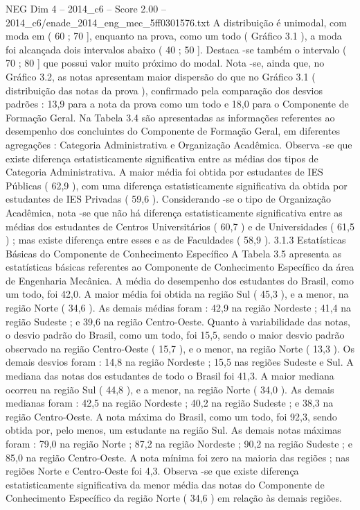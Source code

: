 \begin{textsample}{NEG Dim 4 – 2014\_c6 – Score 2.00 – 2014\_c6/enade\_2014\_eng\_mec\_5ff0301576.txt}
A distribuição é unimodal, com moda em ( 60 ; 70 ], enquanto na prova, como um todo ( Gráfico 3.1 ), a moda foi alcançada dois intervalos abaixo ( 40 ; 50 ].
Destaca -se também o intervalo ( 70 ; 80 ] que possui valor muito próximo do modal.
Nota -se, ainda que, no Gráfico 3.2, as notas apresentam maior dispersão do que no Gráfico 3.1 ( distribuição das notas da prova ), confirmado pela comparação dos desvios padrões : 13,9 para a nota da prova como um todo e 18,0 para o Componente de Formação Geral.
Na Tabela 3.4 são apresentadas as informações referentes ao desempenho dos concluintes do Componente de Formação Geral, em diferentes agregações : Categoria Administrativa e Organização Acadêmica.
Observa -se que existe diferença estatisticamente significativa entre as médias dos tipos de Categoria Administrativa.
A maior média foi obtida por estudantes de IES Públicas ( 62,9 ), com uma diferença estatisticamente significativa da obtida por estudantes de IES Privadas ( 59,6 ).
Considerando -se o tipo de Organização Acadêmica, nota -se que não há diferença estatisticamente significativa entre as médias dos estudantes de Centros Universitários ( 60,7 ) e de Universidades ( 61,5 ) ; mas existe diferença entre esses e as de Faculdades ( 58,9 ). 3.1.3 Estatísticas Básicas do Componente de Conhecimento Específico A Tabela 3.5 apresenta as estatísticas básicas referentes ao Componente de Conhecimento Específico da área de Engenharia Mecânica.
A média do desempenho dos estudantes do Brasil, como um todo, foi 42,0.
A maior média foi obtida na região Sul ( 45,3 ), e a menor, na região Norte ( 34,6 ).
As demais médias foram : 42,9 na região Nordeste ; 41,4 na região Sudeste ; e 39,6 na região Centro-Oeste.
Quanto à variabilidade das notas, o desvio padrão do Brasil, como um todo, foi 15,5, sendo o maior desvio padrão observado na região Centro-Oeste ( 15,7 ), e o menor, na região Norte ( 13,3 ).
Os demais desvios foram : 14,8 na região Nordeste ; 15,5 nas regiões Sudeste e Sul.
A mediana das notas dos estudantes de todo o Brasil foi 41,3.
A maior mediana ocorreu na região Sul ( 44,8 ), e a menor, na região Norte ( 34,0 ).
As demais medianas foram : 42,5 na região Nordeste ; 40,2 na região Sudeste ; e 38,3 na região Centro-Oeste.
A nota máxima do Brasil, como um todo, foi 92,3, sendo obtida por, pelo menos, um estudante na região Sul.
As demais notas máximas foram : 79,0 na região Norte ; 87,2 na região Nordeste ; 90,2 na região Sudeste ; e 85,0 na região Centro-Oeste.
A nota mínima foi zero na maioria das regiões ; nas regiões Norte e Centro-Oeste foi 4,3.
Observa -se que existe diferença estatisticamente significativa da menor média das notas do Componente de Conhecimento Específico da região Norte ( 34,6 ) em relação às demais regiões.

\end{textsample}
